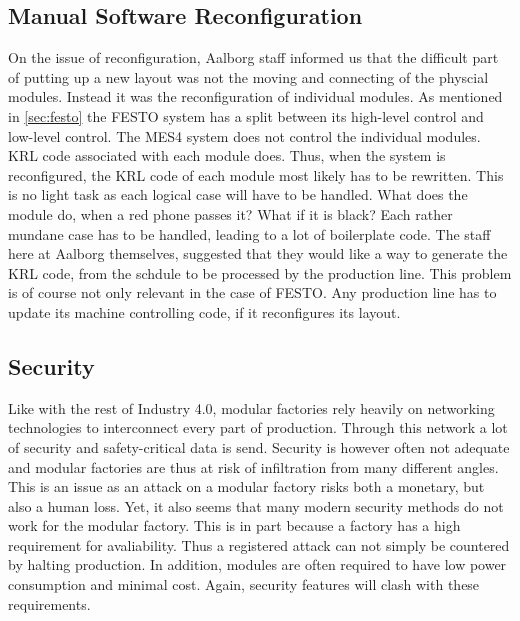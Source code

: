 \subsection{Manual Software Reconfiguration}
On the issue of reconfiguration, Aalborg staff informed us that the difficult part of putting up a new layout was not the moving and connecting of the physcial modules. Instead it was the reconfiguration of individual modules. As mentioned in \cref{sec:festo} the FESTO system has a split between its high-level control and low-level control. The MES4 system does not control the individual modules. KRL code associated with each module does. Thus, when the system is reconfigured, the KRL code of each module most likely has to be rewritten. This is no light task as each logical case will have to be handled. What does the module do, when a red phone passes it? What if it is black? Each rather mundane case has to be handled, leading to a lot of boilerplate code. The staff here at Aalborg themselves, suggested that they would like a way to generate the KRL code, from the schdule to be processed by the production line. This problem is of course not only relevant in the case of FESTO. Any production line has to update its machine controlling code, if it reconfigures its layout.


\subsection{Security}
Like with the rest of Industry 4.0, modular factories rely heavily on networking technologies to interconnect every part of production. Through this network a lot of security and safety-critical data is send. Security is however often not adequate and modular factories are thus at risk of infiltration from many different angles. This is an issue as an attack on a modular factory risks both a monetary, but also a human loss. Yet, it also seems that many modern security methods do not work for the modular factory. This is in part because a factory has a high requirement for avaliability. Thus a registered attack can not simply be countered by halting production. In addition, modules are often required to have low power consumption and minimal cost. Again, security features will clash with these requirements. \cite{Sadeghi2015}

